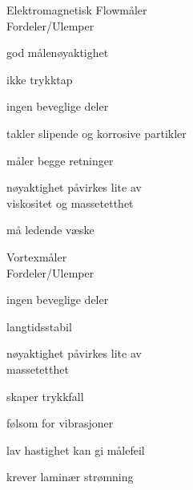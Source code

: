 \documentclass[avery5388,grid,frame]{flashcards}
\begin{document}
\begin{flashcard}{Elektromagnetisk Flowmåler\\Fordeler/Ulemper}
	\begin{multicols}{2}
		\begin{description}
			\item [Fordeler]
			\item god målenøyaktighet
			\item ikke trykktap
			\item ingen beveglige deler
			\item takler slipende og korrosive partikler
			\item måler begge retninger
			\item nøyaktighet påvirkes lite av \\ viskositet og massetetthet
		\columnbreak
			\item [Ulemper]
			\item må ledende væske
		\end{description}
	\end{multicols}
\end{flashcard}

\begin{flashcard}{Vortexmåler\\Fordeler/Ulemper}
	\begin{multicols}{2}
		\begin{description}
			\item [Fordeler]
			\item ingen beveglige deler
			\item langtidsstabil
			\item nøyaktighet påvirkes lite av \\massetetthet
		\columnbreak
			\item [Ulemper]
			\item skaper trykkfall
			\item følsom for vibrasjoner
			\item lav hastighet kan gi målefeil
			\item krever laminær strømning
			\item 
		\end{description}
	\end{multicols}
\end{flashcard}
\end{document}
